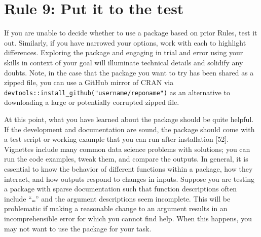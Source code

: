 \documentclass[10pt,letterpaper]{article}
\begin{document}
\hypertarget{rule-9-put-it-to-the-test}{%
\section{Rule 9: Put it to the test}\label{rule-9-put-it-to-the-test}}

If you are unable to decide whether to use a package based on prior
Rules, test it out. Similarly, if you have narrowed your options, work
with each to highlight differences. Exploring the package and engaging
in trial and error using your skills in context of your goal will
illuminate technical details and solidify any doubts. Note, in the case
that the package you want to try has been shared as a zipped file, you
can use a GitHub mirror of CRAN via
\texttt{devtools::install\_github("username/reponame")} as an
alternative to downloading a large or potentially corrupted zipped file.

At this point, what you have learned about the package should be quite
helpful. If the development and documentation are sound, the package
should come with a test script or working example that you can run after
installation {[}52{]}. Vignettes include many common data science
problems with solutions; you can run the code examples, tweak them, and
compare the outputs. In general, it is essential to know the behavior of
different functions within a package, how they interact, and how outputs
respond to changes in inputs. Suppose you are testing a package with
sparse documentation such that function descriptions often include
``\texttt{\ldots{}}'' and the argument descriptions seem incomplete.
This will be problematic if making a reasonable change to an argument
results in an incomprehensible error for which you cannot find help.
When this happens, you may not want to use the package for your task.
\end{document}
